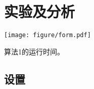 \chapter{实验及分析}

\begin{table}[H]
    \centering
    \texttt{[image: figure/form.pdf]}
    \caption{算法\textsc{1}的运行时间。}
    \label{tab:1}
\end{table}


\section{设置}
